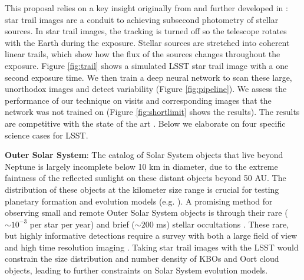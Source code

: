 \documentclass[12pt, letterpaper]{article}
\begin{document}
This proposal relies on a key insight originally from \cite{1986PASP...98..802H} and further developed in \cite{mine}: star trail images are a conduit to achieving subsecond photometry of stellar sources. In star trail images, the tracking is turned off so the telescope rotates with the Earth during the exposure. Stellar sources are stretched into coherent linear trails, which show how the flux of the sources changes throughout the exposure. Figure \ref{fig:trail} shows a simulated LSST star trail image with a one second exposure time. We then train a deep neural network to scan these large, unorthodox images and detect variability (Figure \ref{fig:pipeline}). We assess the performance of our technique on visits and corresponding images that the network was not trained on (Figure \ref{fig:shortlimit} shows the results). The results are competitive with the state of the art \citep{2016SPIE.9908E..0YD}. Below we elaborate on four specific science cases for LSST.


{\bf Outer Solar System}: The catalog of Solar System objects that live beyond Neptune is largely incomplete below 10 km in diameter, due to the extreme faintness of the reflected sunlight on these distant objects beyond 50 AU. The distribution of these objects at the kilometer size range is crucial for testing planetary formation and evolution models (e.g. \citealt{Kenyon04}). A promising method for observing small and remote Outer Solar System objects is through their rare ($\sim10^{-3}$ per star per year) and brief ($\sim200$ ms) stellar occultations \citep{2013AJ....146...14Z}. These rare, but highly informative detections require a survey with both a large field of view and high time resolution imaging \citep{Bianco09}. Taking star trail images with the LSST would constrain the size distribution and number density of KBOs and Oort cloud objects, leading to further constraints on Solar System evolution models.
\end{document}
